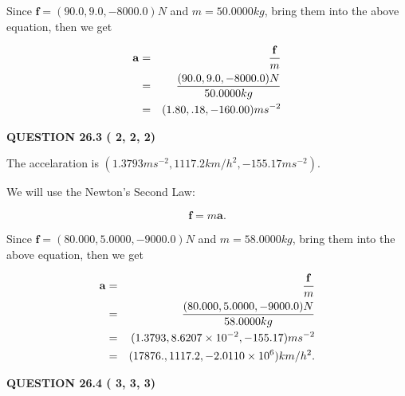 \documentclass[12pt]{article}
\begin{document}
Since $\mathbf{f}= %
(90.0 , 9.0 , -8000.0) N$
and $m= %
50.0000kg$, bring them into the above equation, then we get
 
\begin{eqnarray*}
\mathbf{a}&=&\frac{\mathbf{f}}m  \\
&=&\frac{ %
(90.0 , 9.0 , -8000.0) N}{ %
50.0000kg}  \\
&=& %
(1.80 , .18 , -160.00) ms^{-2}
\end{eqnarray*}
 
 
 
  
\vspace{0.2in}
  
{\textbf{\Large{QUESTION
26.3 
 (          2,          2,          2)
}}}
  
  
 
 
\noindent{}
 
 
The accelaration is
$(
1.3793ms^{-2},
1117.2km/h^2,
-155.17ms^{-2}
).
$
 
 
 
 
 
 
\noindent{}

We will use the Newton's Second Law:
 
\[
\mathbf{f}=m\mathbf{a}.
\]
 
Since $\mathbf{f}=( %
80.000,  %
5.0000,  %
-9000.0 )N$
and $m= %
58.0000kg$, bring them into the above equation, then we get
 
\begin{eqnarray*}
\mathbf{a}&=&\frac{\mathbf{f}}m  \\
&=&\frac{(
80.000 ,
5.0000 ,
-9000.0 )N
}{ %
58.0000 kg}  \\
&=&(
1.3793 ,
8.6207 \times 10^{-2},
-155.17
)ms^{-2} \\
&=&(
17876. ,
1117.2 ,
-2.0110 \times 10^{6}
)km/h^2.
\end{eqnarray*}
 
 
 
  
\vspace{0.2in}
  
{\textbf{\Large{QUESTION
26.4 
 (          3,          3,          3)
}}}
  
  
 
 
\noindent{}
 
\end{document}
